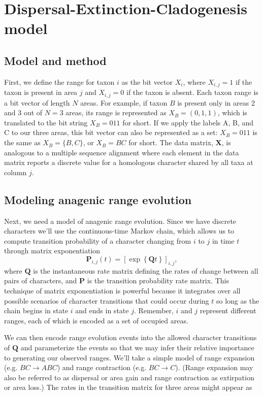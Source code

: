 \section{Dispersal-Extinction-Cladogenesis model}

\subsection{Model and method}

First, we define the range for taxon $i$ as the bit vector $X_i$, where $X_{i,j} = 1$ if the taxon is present in area $j$ and $X_{i,j} = 0$ if the taxon is absent.
Each taxon range is a bit vector of length $N$ areas.
For example, if taxon $B$ is present only in areas 2 and 3 out of $N=3$ areas, its range is represented as $X_B = (0,1,1)$, which is translated to the bit string $X_B=011$ for short.
If we apply the labels A, B, and C to our three areas, this bit vector can also be represented as a set: $X_B=011$ is the same as $X_B = \{ B, C \}$, or $X_B=BC$ for short.
The data matrix, $\textbf{X}$, is analogous to a multiple sequence alignment where each element in the data matrix reports a discrete value for a homologous character shared by all taxa at column $j$.

\subsection{Modeling anagenic range evolution}

Next, we need a model of anagenic range evolution.
Since we have discrete characters we'll use the continuous-time Markov chain, which allows us to compute transition probability of a character changing from $i$ to $j$ in time $t$ through matrix exponentiation
\[
\mathbf{P}_{i,j}(t) = \left[ \exp \left\lbrace \mathbf{Q}t \right\rbrace \right]_{i,j},
\]
where $\textbf{Q}$ is the instantaneous rate matrix defining the rates of change between all pairs of characters, and $\textbf{P}$ is the transition probability rate matrix.
This technique of matrix exponentiation is powerful because it integrates over all possible scenarios of character transitions that could occur during $t$ so long as the chain begins in state $i$ and ends in state $j$. Remember, $i$ and $j$ represent different ranges, each of which is encoded as a set of occupied areas.

We can then encode range evolution events into the allowed character transitions of $\textbf{Q}$ and parameterize the events so that we may infer their relative importance to generating our observed ranges.
We'll take a simple model of range expansion (e.g. $BC \rightarrow ABC$) and range contraction (e.g. $BC \rightarrow C$).
(Range expansion may also be referred to as dispersal or area gain and range contraction as extirpation or area loss.)
The rates in the transition matrix for three areas might appear as

